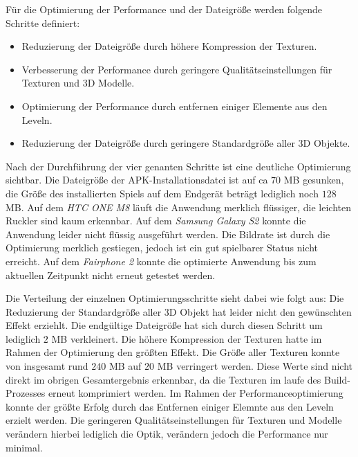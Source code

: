 	Für die Optimierung der Performance und der Dateigröße werden folgende Schritte definiert:
	\begin{itemize}
	\item{ Reduzierung der Dateigröße durch höhere Kompression der Texturen.}
	\item{ Verbesserung der Performance durch geringere Qualitätseinstellungen für Texturen und 3D Modelle.}
	\item{ Optimierung der Performance durch entfernen einiger Elemente aus den Leveln.}
	\item{ Reduzierung der Dateigröße durch geringere Standardgröße aller 3D Objekte.}
	\end{itemize}

	Nach der Durchführung der vier genanten Schritte ist eine deutliche Optimierung sichtbar. Die Dateigröße der APK-Installationsdatei ist auf ca $70$ MB gesunken, die Größe des installierten Spiels auf dem Endgerät beträgt lediglich noch $128$ MB.
	Auf dem \emph{HTC ONE M8} läuft die Anwendung merklich flüssiger, die leichten Ruckler sind kaum erkennbar. Auf dem \emph{Samsung Galaxy S2} konnte die Anwendung leider nicht flüssig ausgeführt werden. Die Bildrate ist durch die Optimierung merklich gestiegen, jedoch ist ein gut spielbarer Status nicht erreicht. Auf dem \emph{Fairphone 2} konnte die optimierte Anwendung bis zum aktuellen Zeitpunkt nicht erneut getestet werden.

	Die Verteilung der einzelnen Optimierungsschritte sieht dabei wie folgt aus:
	Die Reduzierung der Standardgröße aller 3D Objekt hat leider nicht den gewünschten Effekt erziehlt. Die endgültige Dateigröße hat sich durch diesen Schritt um lediglich $2$ MB verkleinert. Die höhere Kompression der Texturen hatte im Rahmen der Optimierung den größten Effekt. Die Größe aller Texturen konnte von insgesamt rund $240$ MB auf $20$ MB verringert werden. Diese Werte sind nicht direkt im obrigen Gesamtergebnis erkennbar, da die Texturen im laufe des Build-Prozesses erneut komprimiert werden.
	Im Rahmen der Performanceoptimierung konnte der größte Erfolg durch das Entfernen einiger Elemnte aus den Leveln erzielt werden. Die geringeren Qualitätseinstellungen für Texturen und Modelle verändern hierbei lediglich die Optik, verändern jedoch die Performance nur minimal.

